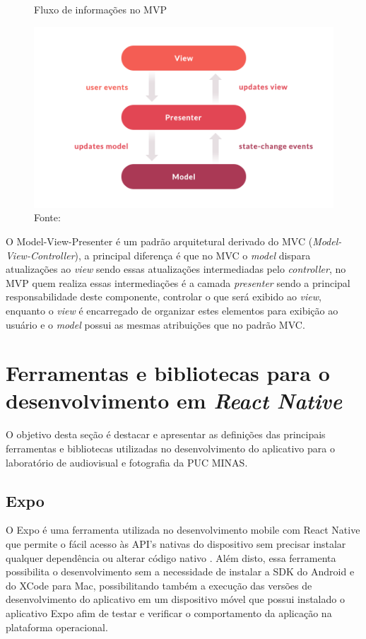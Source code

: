     \begin{figure}[h]
    \caption{Fluxo de informações no MVP}
    \centering %
    \includegraphics[width=12cm]{imagem/react-mvp.png}
    \caption*{Fonte: \cite{Teles2017}}
    \label{figura:react-native-mvp}
    \end{figure}
    
    O Model-View-Presenter é um padrão arquitetural derivado do MVC (\textit{Model-View-Controller}), a principal diferença é que no MVC o \textit{model} dispara atualizações ao \textit{view} sendo essas atualizações intermediadas pelo \textit{controller}, no MVP quem realiza essas intermediações é a camada \textit{presenter} sendo a principal responsabilidade deste componente, controlar o que será exibido ao \textit{view}, enquanto o \textit{view} é encarregado de organizar estes elementos para exibição ao usuário e o \textit{model} possui as mesmas atribuições que no padrão MVC.
    
    \section{Ferramentas e bibliotecas para o desenvolvimento em \textit{React Native}}
    \label{ferramentas-react-native}
    
    O objetivo desta seção é destacar e apresentar as definições das principais ferramentas e bibliotecas utilizadas no desenvolvimento do aplicativo para o laboratório de audiovisual e fotografia da PUC MINAS.
    
    \subsection{Expo}
    O Expo é uma ferramenta utilizada no desenvolvimento mobile com React Native que permite o fácil acesso às API’s nativas do dispositivo sem precisar instalar qualquer dependência ou alterar código nativo \cite{Fernandes2018}. Além disto, essa ferramenta possibilita o desenvolvimento sem a necessidade de instalar a SDK do Android e do XCode para Mac, possibilitando também a execução das versões de desenvolvimento do aplicativo em um dispositivo móvel que possui instalado o aplicativo Expo afim de testar e verificar o comportamento da aplicação na plataforma operacional.
    
